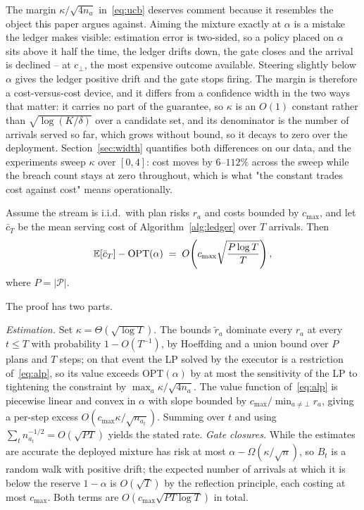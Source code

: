 The margin $\kappa/\sqrt{4n_a}$ in~\eqref{eq:ucb} deserves comment
because it resembles the object this paper argues against. Aiming the
mixture exactly at $\alpha$ is a mistake the ledger makes visible:
estimation error is two-sided, so a policy placed on $\alpha$ sits above
it half the time, the ledger drifts down, the gate closes and the
arrival is declined -- at $c_\bot$, the most expensive outcome
available. Steering slightly below $\alpha$ gives the ledger positive
drift and the gate stops firing. The margin is therefore a
cost-versus-cost device, and it differs from a confidence width in the
two ways that matter: it carries no part of the guarantee, so $\kappa$
is an $O(1)$ constant rather than $\sqrt{\log(K/\delta)}$ over a
candidate set, and its denominator is the number of arrivals served so
far, which grows without bound, so it decays to zero over the
deployment. Section~\ref{sec:width} quantifies both differences on our
data, and the experiments sweep $\kappa$ over $[0,4]$: cost moves by
$6$--$112\%$ across the sweep while the breach count stays at zero
throughout, which is what "the constant trades cost against cost" means
operationally.

\begin{theorem}
\label{thm:regret}
Assume the stream is i.i.d.\ with plan risks $r_a$ and costs bounded by
$c_{\max}$, and let $\bar c_T$ be the mean serving cost of
Algorithm~\ref{alg:ledger} over $T$ arrivals. Then
\begin{equation}
\label{eq:regret}
\mathbb{E}[\bar c_T] - \mathrm{OPT}(\alpha)
\;=\; O\!\left( c_{\max} \sqrt{\frac{P \log T}{T}} \right) ,
\end{equation}
where $P = |\mathcal{P}|$.
\end{theorem}

\begin{pfsketch}
The proof has two parts.

\emph{Estimation.} Set $\kappa = \Theta(\sqrt{\log T})$. The
bounds $\tilde r_a$ dominate every $r_a$ at every $t \le T$ with
probability $1-O(T^{-1})$, by Hoeffding and a union bound over $P$ plans
and $T$ steps; on that event the LP solved by the executor is a
restriction of~\eqref{eq:alp}, so its value exceeds
$\mathrm{OPT}(\alpha)$ by at most the sensitivity of the LP to
tightening the constraint by $\max_a \kappa/\sqrt{4n_a}$. The value
function of~\eqref{eq:alp} is piecewise linear and convex in $\alpha$
with slope bounded by $c_{\max}/\min_{a\ne\bot} r_a$, giving a per-step
excess $O(c_{\max}\kappa/\sqrt{n_{a_t}})$. Summing over $t$ and using
$\sum_t n_{a_t}^{-1/2} = O(\sqrt{PT})$ yields the stated rate.
\emph{Gate closures.} While the estimates are accurate the deployed
mixture has risk at most $\alpha - \Omega(\kappa/\sqrt{n})$, so $B_t$ is
a random walk with positive drift; the expected number of arrivals at
which it is below the reserve $1-\alpha$ is $O(\sqrt{T})$ by the
reflection principle, each costing at most $c_{\max}$. Both terms are
$O(c_{\max}\sqrt{PT\log T})$ in total.
\end{pfsketch}

